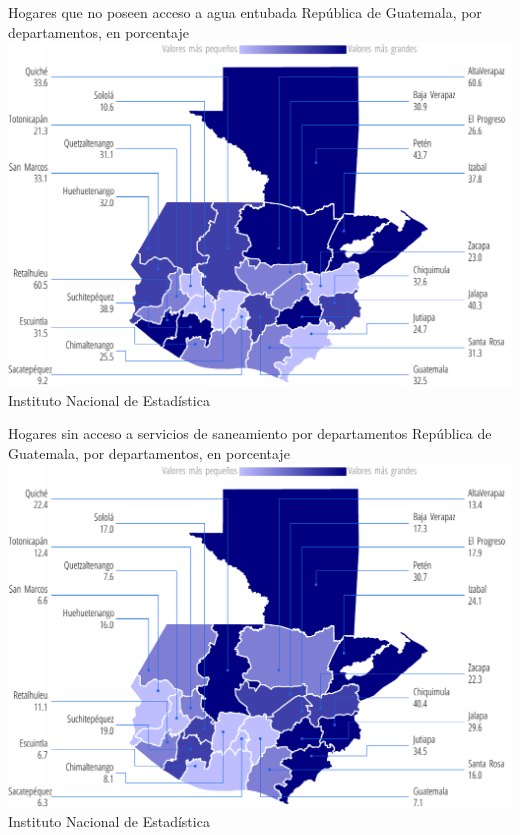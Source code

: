         
          
          
          {%
          }%
          {%
          	Hogares que no poseen acceso a agua entubada
          } %
          {%
          	República de Guatemala, por departamentos, en porcentaje} %
          {%
          	\includegraphics[width=52\cuadri]{graficas/1_14.pdf}}%
          {%
          	Instituto Nacional de Estadística} %
          
          
                    
                    {%
                    }%
                    {%
                    	Hogares sin acceso a servicios de saneamiento por departamentos
                    } %
                    {%
                    	República de Guatemala, por departamentos, en porcentaje} %
                    {%
                    	\includegraphics[width=52\cuadri]{graficas/1_15.pdf}}%
                    {%
                    	Instituto Nacional de Estadística} %

